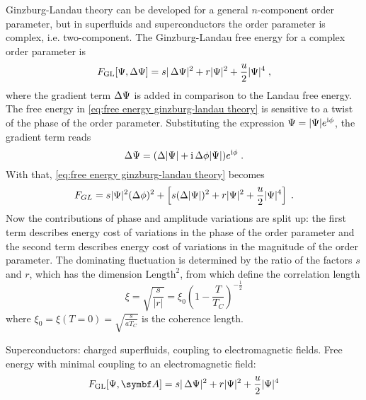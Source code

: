 \documentclass[../notes.tex]{subfiles}
\begin{document}
Ginzburg-Landau theory can be developed for a general \(n\)-component order parameter, but in superfluids and superconductors the order parameter is complex, i.e. two-component.
The Ginzburg-Landau free energy for a complex order parameter is
\begin{equation}
	F_{\mathrm{GL}} [\Psi, \adif{\Psi}] = s \vert \adif{\Psi} \vert^2 + r \vert \Psi \vert^2 + \frac{u}{2} \vert \Psi \vert^4 \;,
	\label{eq:free energy ginzburg-landau theory}
\end{equation}
where the gradient term \(\adif{\Psi}\) is added in comparison to the Landau free energy.
The free energy in \cref{eq:free energy ginzburg-landau theory} is sensitive to a twist of the phase of the order parameter.
Substituting the expression \(\Psi = \vert \Psi \vert e^{\mathrm{i} \phi}\), the gradient term reads
\begin{equation}
	\Delta \Psi = (\adif{\vert \Psi \vert} + \iu \adif{\phi} \vert \Psi \vert) e^{\iu \phi} \;.
\end{equation}
With that, \cref{eq:free energy ginzburg-landau theory} becomes
\begin{equation}
	F_{GL}  = s \vert \Psi \vert^2 (\adif{\phi})^2 + \left[ s (\adif{\vert \Psi \vert})^2 + r \vert \Psi \vert^2 + \frac{u}{2} \vert \Psi \vert^4 \right] \;.
\end{equation}
Now the contributions of phase and amplitude variations are split up: the first term describes energy cost of variations in the phase of the order parameter and the second term describes energy cost of variations in the magnitude of the order parameter.
The dominating fluctuation is determined by the ratio of the factors \(s\) and \(r\), which has the dimension \(\mathrm{Length}^2\), from which define the correlation length
\begin{equation}
	\xi = \sqrt{\frac{s}{\vert r \vert}} = \xi_0 \left(1 - \frac{T}{T_C}\right)^{-\frac{1}{2}}
\end{equation}
where \(\xi_0 = \xi(T=0) = \sqrt{\frac{s}{a T_C}}\) is the coherence length.

Superconductors: charged superfluids, coupling to electromagnetic fields.
Free energy with minimal coupling to an electromagnetic field:
\begin{equation}
	F_{\mathrm{GL}} [\Psi, \vb{A}] = s \vert \adif{\Psi} \vert^2 + r \vert \Psi \vert^2 + \frac{u}{2} \vert \Psi \vert^4
\end{equation}
\end{document}
